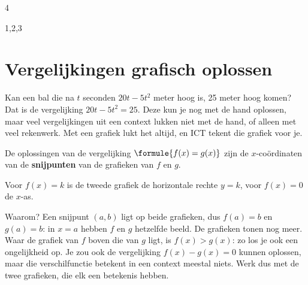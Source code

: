 \begin{alleenvoor}{4}
{{}}

\end{alleenvoor}
\begin{alleenvoor}{1,2,3}
\section{Vergelijkingen grafisch oplossen}

Kan een bal die na $t$ seconden $20t - 5t^2$ meter hoog is, 25 meter hoog komen? Dat is de vergelijking $20t - 5t^2 = 25$. Deze kun je nog met de hand oplossen, maar veel vergelijkingen uit een context lukken niet met de hand, of alleen met veel rekenwerk. Met een grafiek lukt het altijd, en ICT tekent die grafiek voor je.

\begin{theorie}
De oplossingen van de vergelijking $\formule{f(x) = g(x)}$ zijn de $x$-coördinaten van de \textbf{\textcolor{accent}{snijpunten}} van de grafieken van $f$ en $g$.

Voor $f(x) = k$ is de tweede grafiek de horizontale rechte $y = k$, voor $f(x) = 0$ de $x$-as.
\end{theorie}

Waarom? Een snijpunt $(a, b)$ ligt op beide grafieken, dus $f(a) = b$ en $g(a) = b$: in $x = a$ hebben $f$ en $g$ hetzelfde beeld. De grafieken tonen nog meer. Waar de grafiek van $f$ boven die van $g$ ligt, is $f(x) > g(x)$: zo los je ook een ongelijkheid op. Je zou ook de vergelijking $f(x) - g(x) = 0$ kunnen oplossen, maar die verschilfunctie betekent in een context meestal niets. Werk dus met de twee grafieken, die elk een betekenis hebben.


\end{alleenvoor}
